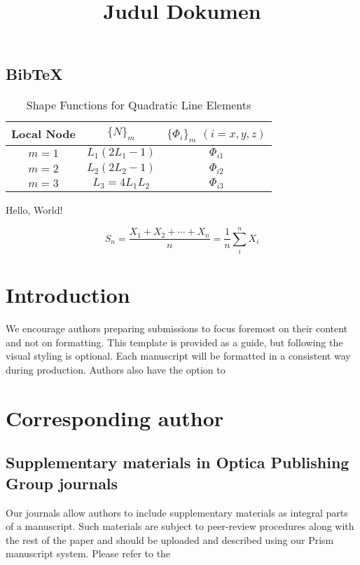 \documentclass{article}
\title{Judul Dokumen}
\begin{document}
\maketitle 

\subsection{Bib\TeX}
\label{sec:bibtex}

\begin{table}[htbp]
\caption{Shape Functions for Quadratic Line Elements}
  \label{tab:shape-functions}
  \centering
\begin{tabular}{ccc}
\hline
Local Node & $\{N\}_m$ & $\{\Phi_i\}_m$ $(i=x,y,z)$ \\
\hline
$m = 1$ & $L_1(2L_1-1)$ & $\Phi_{i1}$ \\
$m = 2$ & $L_2(2L_2-1)$ & $\Phi_{i2}$ \\
$m = 3$ & $L_3=4L_1L_2$ & $\Phi_{i3}$ \\
\hline
\end{tabular}
\end{table}


Hello, World!

\[S_n = \frac{X_1 + X_2 + \cdots + X_n}{n}
      = \frac{1}{n}\sum_{i}^{n} X_i\]
\section{Introduction}
      We encourage authors preparing submissions to focus foremost on their content and not on formatting. This template is provided as a guide, but following the visual styling is optional. Each manuscript will be formatted in a consistent way during production. Authors also have the option to 
     
\section{Corresponding author}

\subsection{Supplementary materials in Optica Publishing Group journals}
Our journals allow authors to include supplementary materials as integral parts of a manuscript. Such materials are subject to peer-review procedures along with the rest of the paper and should be uploaded and described using our Prism manuscript system. Please refer to the 
\end{document}
